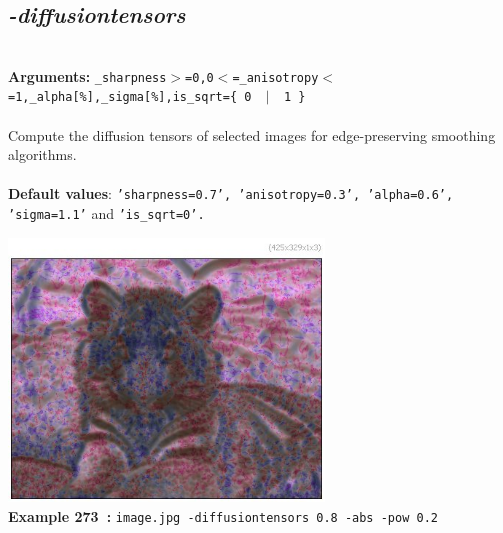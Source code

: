 \documentclass[a4paper,11pt,twoside]{book}
\begin{document}
\subsection{\emph{-diffusiontensors} }\vspace*{-0.5em}
~\\\textbf{Arguments: } 
{\small \texttt{\_sharpness$>$=0,0$<$=\_anisotropy$<$=1,\_alpha[\%],\_sigma[\%],is\_sqrt=\{ 0 ~$|$~ 1 \}}}\\~\\
Compute the diffusion tensors of selected images for edge-preserving smoothing algorithms.
~\\~\\\textbf{Default values}: {\small \texttt{'sharpness=0.7', 'anisotropy=0.3', 'alpha=0.6', 'sigma=1.1'} and \texttt{'is\_sqrt=0'.}}
\begin{center}\includegraphics[keepaspectratio=true,height=7cm,width=\textwidth]{img/gmic_def273.jpg}\\
{\footnotesize \textbf{Example 273~:} \texttt{image.jpg -diffusiontensors 0.8 -abs -pow 0.2}}
\end{center}
\end{document}
